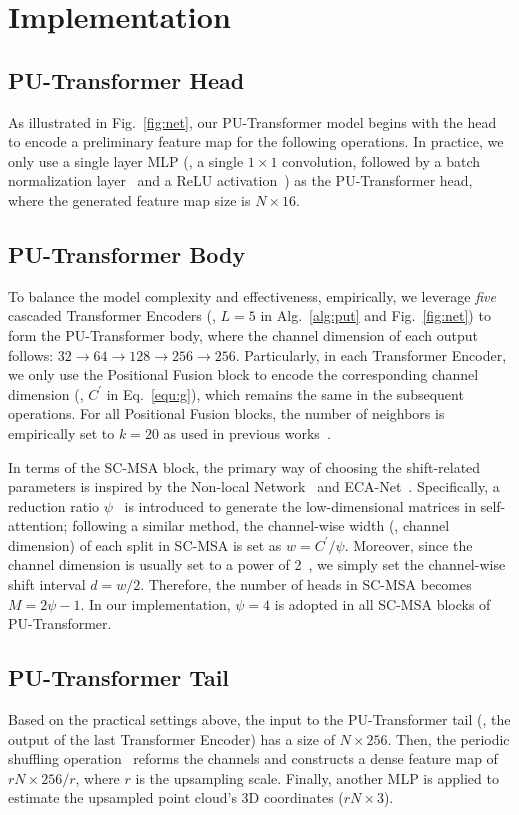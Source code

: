 \section{Implementation}
\label{sec:impl}
\subsection{PU-Transformer Head}
\label{sec:head}
As illustrated in Fig.~\ref{fig:net}, our PU-Transformer model begins with the head to encode a preliminary feature map for the following operations. In practice, we only use a single layer MLP (\ie, a single $1\times1$ convolution, followed by a batch normalization layer~\cite{ioffe2015batch} and a ReLU activation~\cite{nair2010rectified}) as the PU-Transformer head, where the generated feature map size is $N\times16$.

\subsection{PU-Transformer Body}
\label{sec:pu_body}
To balance the model complexity and effectiveness, empirically, we leverage \emph{five} cascaded Transformer Encoders (\ie, $L=5$ in Alg.~\ref{alg:put} and Fig.~\ref{fig:net}) to form the PU-Transformer body, where the channel dimension of each output follows: $32\rightarrow64\rightarrow128\rightarrow256\rightarrow256$. Particularly, in each Transformer Encoder, we only use the Positional Fusion block to encode the corresponding channel dimension (\ie, $C^{\prime}$ in Eq.~\ref{equ:g}), which remains the same in the subsequent operations. For all Positional Fusion blocks, the number of neighbors is empirically set to $k=20$ as used in previous works~\cite{wang2019dynamic,qian2021pu}.

In terms of the SC-MSA block, the primary way of choosing the shift-related parameters is inspired by the Non-local Network~\cite{wang2018non} and ECA-Net~\cite{Wang_2020_CVPR}. Specifically, a reduction ratio $\psi$~\cite{wang2018non} is introduced to generate the low-dimensional matrices in self-attention; following a similar method, the channel-wise width (\ie, channel dimension) of each split in SC-MSA is set as $w=C^\prime/\psi$. Moreover, since the channel dimension is usually set to a power of 2~\cite{Wang_2020_CVPR}, we simply set the channel-wise shift interval $d = w/2$. Therefore, the number of heads in SC-MSA becomes $M=2\psi-1$. In our implementation, $\psi=4$ is adopted in all SC-MSA blocks of PU-Transformer. 

\subsection{PU-Transformer Tail}
\label{sec:tail}
Based on the practical settings above, the input to the PU-Transformer tail (\ie, the output of the last Transformer Encoder) has a size of $N\times256$. Then, the periodic shuffling operation~\cite{shi2016real} reforms the channels and constructs a dense feature map of $rN\times256/r$, where $r$ is the upsampling scale. Finally, another MLP is applied to estimate the upsampled point cloud's 3D coordinates ($rN\times3$).
